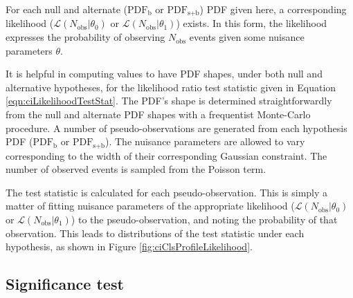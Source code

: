 For each null and alternate ($\text{PDF}_\text{b}$ or $\text{PDF}_\text{s+b}$) PDF given here, a corresponding likelihood ($\mathcal{L}(N_\text{obs}|\theta_0)$ or $\mathcal{L}(N_\text{obs}|\theta_1)$) exists.
In this form, the likelihood expresses the probability of observing $N_\text{obs}$ events given some nuisance parameters $\theta$.

It is helpful in computing \cls values to have PDF shapes, under both null and alternative hypotheses, for the likelihood ratio test statistic given in Equation \ref{eqn:ciLikelihoodTestStat}.
The PDF's shape is determined straightforwardly from the null and alternate PDF shapes with a frequentist Monte-Carlo procedure.
A number of pseudo-observations are generated from each hypothesis PDF ($\text{PDF}_\text{b}$ or $\text{PDF}_\text{s+b}$).
The nuisance parameters are allowed to vary corresponding to the width of their corresponding Gaussian constraint.
The number of observed events is sampled from the Poisson term.

The test statistic is calculated for each pseudo-observation.
This is simply a matter of fitting nuisance parameters of the appropriate likelihood ($\mathcal{L}(N_\text{obs}|\theta_0)$ or $\mathcal{L}(N_\text{obs}|\theta_1)$) to the pseudo-observation, and noting the probability of that observation.
This leads to distributions of the test statistic under each hypothesis, as shown in Figure \ref{fig:ciClsProfileLikelihood}.

\subsection{Significance test}\label{sec:ciSigTest}

